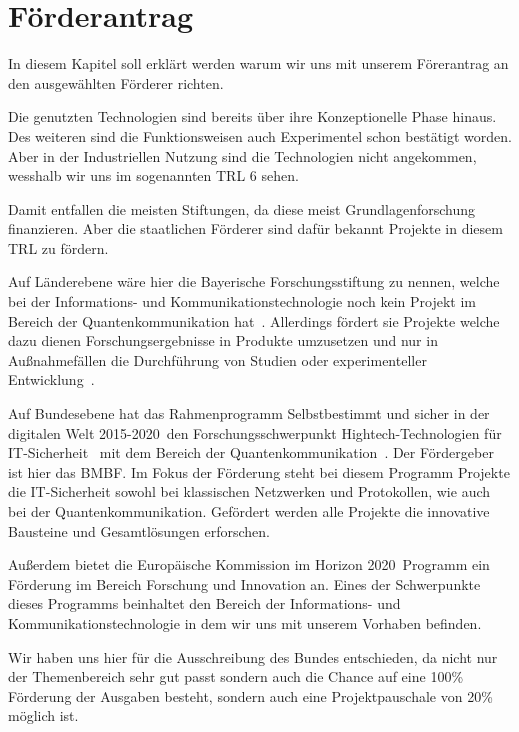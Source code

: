 \chapter{Förderantrag}\label{foerderantrag}

In diesem Kapitel soll erklärt werden warum wir uns mit unserem Förerantrag an den ausgewählten Förderer richten.

Die genutzten Technologien sind bereits über ihre Konzeptionelle Phase hinaus.
Des weiteren sind die Funktionsweisen auch Experimentel schon bestätigt worden.
Aber in der Industriellen Nutzung sind die Technologien nicht angekommen, wesshalb wir uns im sogenannten \ac{TRL} 6 sehen.

Damit entfallen die meisten Stiftungen, da diese meist Grundlagenforschung finanzieren.
Aber die staatlichen Förderer sind dafür bekannt Projekte in diesem \ac{TRL} zu fördern.

Auf Länderebene wäre hier die Bayerische Forschungsstiftung zu nennen, welche bei der Informations- und Kommunikationstechnologie noch kein Projekt im Bereich der Quantenkommunikation hat~\cite{bayerischeForschungsstiftung}.
Allerdings fördert sie Projekte welche dazu dienen Forschungsergebnisse in Produkte umzusetzen und nur in Außnahmefällen die Durchführung von Studien oder experimenteller Entwicklung~\cite{bayerischeForschungsstiftung}.

Auf Bundesebene hat das Rahmenprogramm \glqq Selbstbestimmt und sicher in der digitalen Welt 2015-2020\grqq~den Forschungsschwerpunkt \glqq Hightech-Technologien für IT-Sicherheit \grqq~mit dem Bereich der Quantenkommunikation~\cite{BundRahmenprogramm}.
Der Fördergeber ist hier das \ac{BMBF}.
Im Fokus der Förderung steht bei diesem Programm Projekte die IT-Sicherheit sowohl bei klassischen Netzwerken und Protokollen, wie auch bei der Quantenkommunikation.
Gefördert werden alle Projekte die innovative Bausteine und Gesamtlösungen erforschen.

Außerdem bietet die Europäische Kommission im \glqq Horizon 2020\grqq~Programm ein Förderung im Bereich Forschung und Innovation an.
Eines der Schwerpunkte dieses Programms beinhaltet den Bereich der Informations- und Kommunikationstechnologie in dem wir uns mit unserem Vorhaben befinden.

Wir haben uns hier für die Ausschreibung des Bundes entschieden, da nicht nur der Themenbereich sehr gut passt sondern auch die Chance auf eine 100\% Förderung der Ausgaben besteht, sondern auch eine Projektpauschale von 20\% möglich ist.


